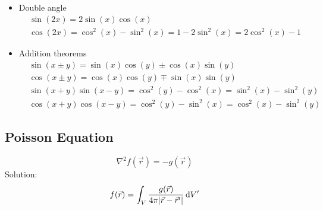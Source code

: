 \documentclass[a4paper, fontsize=8pt, landscape, DIV=1]{scrartcl}
\begin{document}
\begin{multicols*}{4}
\begin{itemize}
    \item Double angle
    {\small\begin{align*}
      & \sin(2x) = 2\sin(x)\cos(x) \\
      & \cos(2x) = \cos^2(x)-\sin^2(x) = 1-2\sin^2(x) = 2\cos^2(x) - 1
    \end{align*}}%

    \item Addition theorems
    {\small\begin{align*}
      & \sin(x\pm y) = \sin(x)\cos(y) \pm \cos(x)\sin(y) \\
      & \cos(x\pm y) = \cos(x)\cos(y) \mp \sin(x)\sin(y) \\
      & \sin(x+y)\sin(x-y) = \cos^2(y)-\cos^2(x) = \sin^2(x) - \sin^2(y)\\
      & \cos(x+y)\cos(x-y) = \cos^2(y)-\sin^2(x) = \cos^2(x) - \sin^2(y)
    \end{align*}}%
  \end{itemize}

  \subsection{Poisson Equation}
    \[\nabla^2f(\vec{r}) = -g(\vec{r})\]
    Solution:
    \[f(\vec{r}) = \int_V \frac{g(\vec{r})}{4\pi|\vec{r}-\vec{r}'|} \,\mathrm{d} V'\]

  
  \vfill\null
  \columnbreak
  \end{multicols*}
\end{document}
